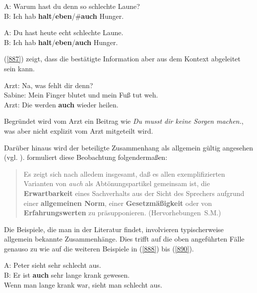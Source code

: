 {\begin{exe}
	\ex\label{885}
	A: Warum hast du denn so schlechte Laune?\\
	B: Ich hab \textbf{halt}/\textbf{eben}/\#\textbf{auch} Hunger.
\end{exe}

\begin{exe}
	\ex\label{886}
	A: Du hast heute echt schlechte Laune.\\
	B: Ich hab \textbf{halt}/\textbf{eben}/\textbf{auch} Hunger.
\end{exe}
(\ref{887}) zeigt, dass die bestätigte Information aber aus dem Kontext abgeleitet sein kann.

\begin{exe}
	\ex\label{887}
	Arzt: Na, was fehlt dir denn?\\
	Sabine: Mein Finger blutet und mein Fuß tut weh.\\
	Arzt: Die werden \textbf{auch} wieder heilen.	 
	\hfill\hbox {\citet[118]{Bublitz1978}}
\end{exe}
Begründet wird vom Arzt ein Beitrag wie \textit{Du musst dir keine Sorgen machen.}, was aber nicht explizit vom Arzt mitgeteilt wird.

Darüber hinaus wird der beteiligte Zusammenhang als allgemein gültig angesehen (vgl. \citealt[47]{Dahl1988}). \citet[103]{Burkhardt1982} formuliert diese Beobachtung folgendermaßen: 

\begin{quotation}
Es zeigt sich nach alledem insgesamt, daß es allen exemplifizierten Varianten von \textit{auch} als Abtönungspartikel gemeinsam ist, die \textbf{Erwartbarkeit} eines Sachverhalts aus der Sicht des Sprechers aufgrund einer \textbf{allgemeinen Norm}, einer \textbf{Gesetzmäßigkeit} oder von \textbf{Erfahrungswerten} zu präsupponie\-ren.
\hfill\hbox {(Hervorhebungen S.M.)}
\end{quotation}
Die Beispiele, die man in der Literatur findet, involvieren typischerweise allgemein bekannte Zusammenhänge. Dies trifft auf die oben angeführten Fälle genauso zu wie auf die weiteren Beispiele in (\ref{888}) bis (\ref{890}).

\begin{exe}
	\ex\label{888}
	A: Peter sieht sehr schlecht aus.\\	 
	B: Er ist \textbf{auch} sehr lange krank gewesen.
	\hfill\hbox {\citet[88]{Helbig1990}}\\
	\glq Wenn man lange krank war, sieht man schlecht aus.\grq {}
\end{exe}

}
